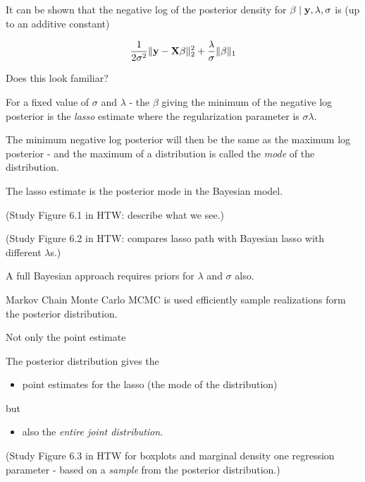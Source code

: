 \documentclass[
  ignorenonframetext,
]{beamer}
\providecommand{\tightlist}{%
  \setlength{\itemsep}{0pt}\setlength{\parskip}{0pt}}
\begin{document}
\begin{frame}

It can be shown that the negative log of the posterior density for
\(\beta \mid {\bf y}, \lambda, \sigma\) is (up to an additive constant)

\[\frac{1}{2\sigma^2} \Vert {\bf y}-{\bf X}\beta\Vert_2^2 +\frac{\lambda}{\sigma} \Vert \beta \Vert_1\]

Does this look familiar?

\end{frame}

\begin{frame}

For a fixed value of \(\sigma\) and \(\lambda\) - the \(\beta\) giving
the minimum of the negative log posterior is the \emph{lasso} estimate
where the regularization parameter is \(\sigma \lambda\).

The minimum negative log posterior will then be the same as the maximum
log posterior - and the maximum of a distribution is called the
\emph{mode} of the distribution.

The lasso estimate is the posterior mode in the Bayesian model.

(Study Figure 6.1 in HTW: describe what we see.)

\end{frame}

\begin{frame}

(Study Figure 6.2 in HTW: compares lasso path with Bayesian lasso with
different \(\lambda\)s.)

A full Bayesian approach requires priors for \(\lambda\) and \(\sigma\)
also.

Markov Chain Monte Carlo MCMC is used efficiently sample realizations
form the posterior distribution.

\end{frame}

\begin{frame}

\begin{block}{Not only the point estimate}

The posterior distribution gives the

\begin{itemize}
\tightlist
\item
  point estimates for the lasso (the mode of the distribution)
\end{itemize}

but

\begin{itemize}
\tightlist
\item
  also the \emph{entire joint distribution}.
\end{itemize}

(Study Figure 6.3 in HTW for boxplots and marginal density one
regression parameter - based on a \emph{sample} from the posterior
distribution.)

\end{block}

\end{frame}
\end{document}
